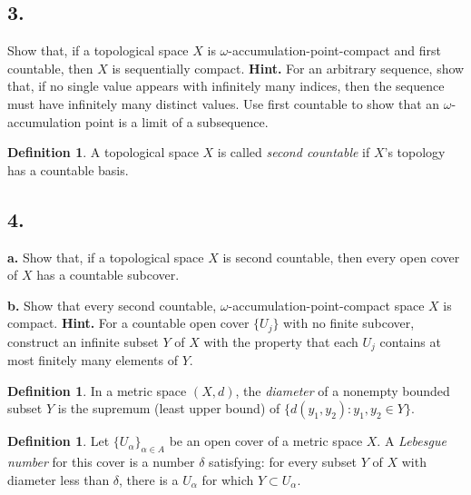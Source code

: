 \documentclass{amsart}
\theoremstyle{plain}
\theoremstyle{definition}
\newtheorem{definition}[theorem]{Definition}
\theoremstyle{remark}
\begin{document}
\subsection*{3.} Show that, if a topological space $X$ is $\omega$-accumulation-point-compact and first countable, then $X$ is sequentially compact. {\bfseries Hint.} For an arbitrary sequence, show that, if no single value appears with infinitely many indices, then the sequence must have infinitely many distinct values. Use first countable to show that an $\omega$-accumulation point is a limit of a subsequence. 

\vspace{.15in}
\begin{definition} A topological space $X$ is called {\it second countable} if $X$'s topology has a countable basis. \end{definition}


\vspace{.15in}
\noindent
\subsection*{4.} 

\noindent
{\bfseries a.} Show that, if a topological space $X$ is second countable, then every open cover of $X$ has a countable subcover.

\vspace{.1in}
\noindent
{\bfseries b.} Show that every second countable, $\omega$-accumulation-point-compact space $X$ is compact. {\bfseries Hint.} For a countable open cover $\{ U_j\}$ with no finite subcover, construct an infinite subset $Y$ of $X$ with the property that each $U_j$ contains at most finitely many elements of $Y$. 

\vspace{.15in}
\begin{definition} In a metric space $(X,d)$, the {\it diameter} of a nonempty bounded subset $Y$ is the supremum (least upper bound) of $\{ d(y_1, y_2) : y_1, y_2 \in Y\}$. \end{definition}

\vspace{.15in}
\begin{definition} Let $\{ U_{\alpha}\} _{\alpha \in A}$ be an open cover of a metric space $X$. A {\it Lebesgue number} for this cover is a number $\delta$ satisfying: for every subset $Y$ of $X$ with diameter less than $\delta$, there is a $U_{\alpha}$ for which $Y\subset U_{\alpha}$. \end{definition}
\end{document}
